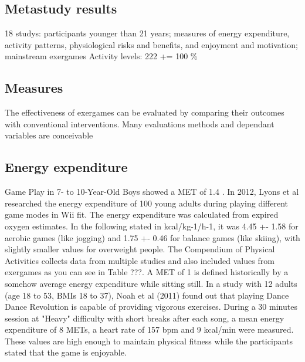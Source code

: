 \subsection{Metastudy results}

\cite{biddiss2010active}
18 studys: participants younger than 21 years; measures of energy expenditure, activity patterns, physiological risks and benefits, and enjoyment and motivation; mainstream exergames
 Activity levels: 222 += 100 \%





\subsection{Measures}
The effectiveness of exergames can be evaluated by comparing their outcomes with conventional interventions. Many evaluations methods and dependant variables are conceivable 

\subsection{Energy expenditure}
Game Play in 7- to 10-Year-Old Boys showed a MET of 1.4 \cite{ainsworth20112011}.
In 2012, Lyons et al \cite{lyons2012novel} researched the energy expenditure of 100 young adults during playing different game modes in Wii fit. The energy expenditure was calculated from expired oxygen estimates. In the following stated in kcal/kg-1/h-1, it was 4.45 +- 1.58 for aerobic games (like jogging) and 1.75 +- 0.46 for balance games (like skiing), with slightly smaller values for overweight people. The Compendium of Physical Activities \cite{ainsworth20112011} collects data from multiple studies and also included values from exergames as you can see in Table ???. A MET of 1 is defined historically by a somehow average energy expenditure while sitting still.
In a study with 12 adults (age 18 to 53, BMIs 18 to 37), Noah et al (2011) \cite{noah2011vigorous} found out that playing Dance Dance Revolution is capable of providing vigorous exercises. During a 30 minutes session at "Heavy" difficulty with short breaks after each song, a mean energy expenditure of 8 METs, a heart rate of 157 bpm and 9 kcal/min were measured. These values are high enough to maintain physical fitness while the participants stated that the game is enjoyable. 


